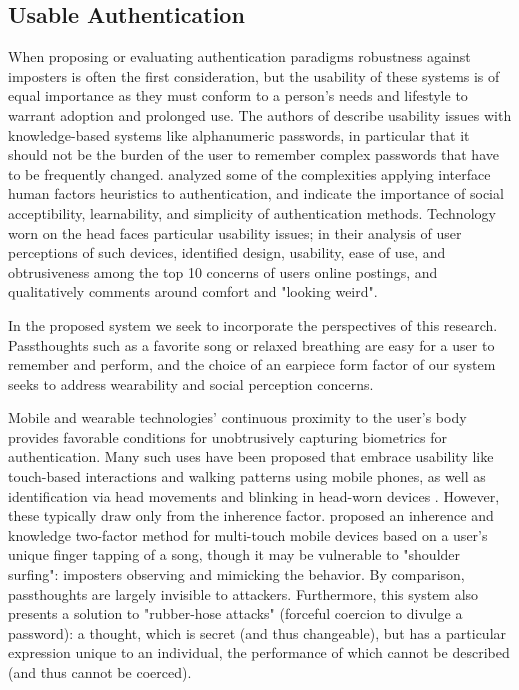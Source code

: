 \documentclass{sigchi}
\begin{document}
\subsection{Usable Authentication}

When proposing or evaluating authentication paradigms robustness against imposters is often the first consideration, but the usability of these systems is of equal importance as they must conform to a person's needs and lifestyle to warrant adoption and prolonged use. The authors of \cite{sasse2001} describe usability issues with knowledge-based systems like alphanumeric passwords, in particular that it should not be the burden of the user to remember complex passwords that have to be frequently changed. \cite{braz2006} analyzed some of the complexities applying interface human factors heuristics to authentication, and indicate the importance of social acceptibility, learnability, and simplicity of authentication methods. Technology worn on the head faces particular usability issues; in their analysis of user perceptions of such devices, \cite{Genaro2014} identified design, usability, ease of use, and obtrusiveness among the top 10 concerns of users online postings, and qualitatively comments around comfort and "looking weird".

In the proposed system we seek to incorporate the perspectives of this research. Passthoughts such as a favorite song or relaxed breathing are easy for a user to remember and perform, and the choice of an earpiece form factor of our system seeks to address wearability and social perception concerns.

Mobile and wearable technologies' continuous proximity to the user's body provides favorable conditions for unobtrusively capturing biometrics for authentication. Many such uses have been proposed that embrace usability like touch-based interactions \cite{Tartz2015, Holz2015} and walking patterns \cite{Lu2014} using mobile phones, as well as identification via head movements and blinking in head-worn devices \cite{Rogers2015}. However, these typically draw only from the inherence factor. \cite{Chen2015} proposed an inherence and knowledge two-factor method for multi-touch mobile devices based on a user's unique finger tapping of a song, though it may be vulnerable to "shoulder surfing": imposters observing and mimicking the behavior. By comparison, passthoughts are largely invisible to attackers. Furthermore, this system also presents a solution to "rubber-hose attacks" (forceful coercion to divulge a password): a thought, which is secret (and thus changeable), but has a particular expression unique to an individual, the performance of which cannot be described (and thus cannot be coerced).
\end{document}
